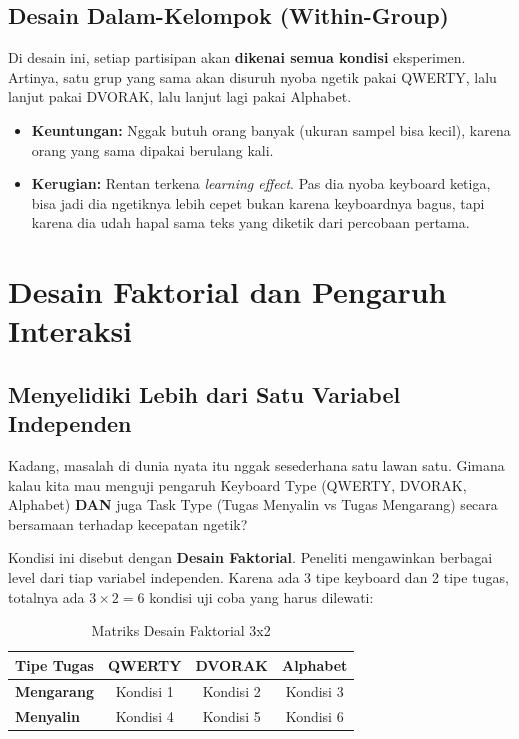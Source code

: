 \documentclass[12pt,a4paper]{article}
\begin{document}
\subsection{Desain Dalam-Kelompok (Within-Group)}
Di desain ini, setiap partisipan akan \textbf{dikenai semua kondisi} eksperimen. Artinya, satu grup yang sama akan disuruh nyoba ngetik pakai QWERTY, lalu lanjut pakai DVORAK, lalu lanjut lagi pakai Alphabet.
\begin{itemize}
    \item \textbf{Keuntungan:} Nggak butuh orang banyak (ukuran sampel bisa kecil), karena orang yang sama dipakai berulang kali.
    \item \textbf{Kerugian:} Rentan terkena \textit{learning effect}. Pas dia nyoba keyboard ketiga, bisa jadi dia ngetiknya lebih cepet bukan karena keyboardnya bagus, tapi karena dia udah hapal sama teks yang diketik dari percobaan pertama.
\end{itemize}

\newpage
\section{Desain Faktorial dan Pengaruh Interaksi}

\subsection{Menyelidiki Lebih dari Satu Variabel Independen}
Kadang, masalah di dunia nyata itu nggak sesederhana satu lawan satu. Gimana kalau kita mau menguji pengaruh Keyboard Type (QWERTY, DVORAK, Alphabet) \textbf{DAN} juga Task Type (Tugas Menyalin vs Tugas Mengarang) secara bersamaan terhadap kecepatan ngetik?

Kondisi ini disebut dengan \textbf{Desain Faktorial}. Peneliti mengawinkan berbagai level dari tiap variabel independen.
Karena ada 3 tipe keyboard dan 2 tipe tugas, totalnya ada $3 \times 2 = 6$ kondisi uji coba yang harus dilewati:

\begin{table}[h]
\centering
\begin{tabular}{@{}lccc@{}}
\toprule
\textbf{Tipe Tugas} & \textbf{QWERTY} & \textbf{DVORAK} & \textbf{Alphabet} \\ \midrule
\textbf{Mengarang} & Kondisi 1 & Kondisi 2 & Kondisi 3 \\
\textbf{Menyalin} & Kondisi 4 & Kondisi 5 & Kondisi 6 \\ \bottomrule
\end{tabular}
\caption{Matriks Desain Faktorial 3x2}
\end{table}
\end{document}
